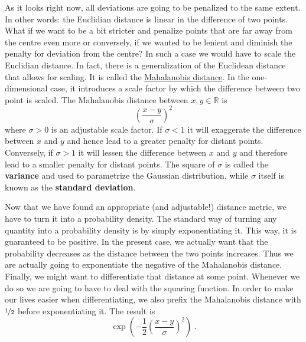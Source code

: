 \documentclass[a4paper,11pt,leqno]{report}\usepackage[]{graphicx}\usepackage[]{color}
\begin{document}
As it looks right now, all deviations are going to be penalized to the same extent. In other words: the Euclidian distance is linear in the difference of two points.
What if we want to be a bit stricter and penalize points that are far away from the centre even more or conversely, if we wanted to be lenient and diminish the penalty
for deviation from the centre? In such a case we would have to scale the Euclidian distance. In fact, there is a generalization of the Euclidean distance that
allows for scaling. It is called the \href{https://en.wikipedia.org/wiki/Mahalanobis_distance}{Mahalanobis distance}. In the one-dimensional case, it introduces
a scale factor by which the difference between two point is scaled. The Mahalanobis distance between $ x,y \in \mathbb{R} $ is 
\begin{equation*}
\left(\frac{x - y}{\sigma}\right)^{2}
\end{equation*}
where $ \sigma > 0 $ is an adjustable scale factor. If $ \sigma < 1 $ it will exaggerate the difference between $ x $ and $ y $ and hence lead to a greater
penalty for distant points. Conversely, if $ \sigma > 1 $ it will lessen the difference between $ x $ and $ y $ and therefore lead to a smaller penalty for 
distant points. The square of $ \sigma $ is called the \textbf{variance} and used to parametrize the Gaussian distribution, while $ \sigma $ itself is 
known as the \textbf{standard deviation}.

Now that we have found an appropriate (and adjustable!) distance metric, we have to turn it into a probability density. The standard way of turning any quantity
into a probability density is by simply exponentiating it. This way, it is guaranteed to be positive. In the present case, we actually want that the probability
decreases as the distance between the two points increases. Thus we are actually going to exponentiate the negative of the Mahalanobis distance. Finally, we
might want to differentiate that distance at some point. Whenever we do so we are going to have to deal with the squaring function. In order to make our lives
easier when differentiating, we also prefix the Mahalanobis distance with $ \nicefrac{1}{2} $ before exponentiating it. The result is
\begin{equation}
\exp\left(-\frac{1}{2} \left(\frac{x - y}{\sigma}\right)^{2} \right) \ .
\end{equation}
\end{document}
